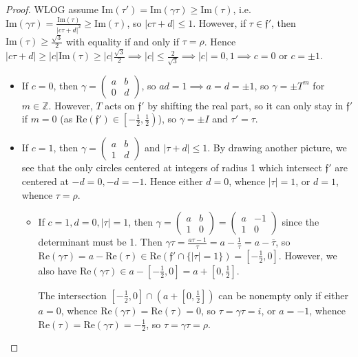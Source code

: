 \documentclass{article}
\theoremstyle{definition}
\begin{document}
\begin{proof}
    WLOG assume $\text{Im}(\tau') = \text{Im}(\gamma \tau) \ge \text{Im}(\tau)$, i.e. $\text{Im}(\gamma \tau) = \frac{\text{Im}(\tau)}{|c \tau + d|^2} \ge \text{Im}(\tau)$, so $|c \tau +d| \le 1$. However, if $\tau \in \mathfrak{f}'$, then $\text{Im}(\tau) \ge \frac{\sqrt{3}}{2}$ with equality if and only if $\tau = \rho$. Hence $|c \tau + d| \ge |c| \text{Im}(\tau) \ge |c|\frac{\sqrt{3}}{2} \implies |c|\le \frac{2}{\sqrt{3}} \implies |c| = 0, 1 \implies c = 0$ or $c = \pm 1$. 
    \begin{itemize}
        \item If $c=0$, then $\gamma =\begin{pmatrix} a&b\\0&d \end{pmatrix}$, so $ad = 1 \implies a = d = \pm 1$, so $\gamma = \pm T^m$ for $m \in \mathbb{Z}$. However, $T$ acts on $\mathfrak{f}'$ by shifting the real part, so it can only stay in $\mathfrak{f}'$ if $m = 0$ (as $\text{Re}(\mathfrak{f}') \in \left[-\frac{1}{2},\frac{1}{2}\right)$), so $\gamma = \pm I$ and $\tau' = \tau$.
        \item If $c=1$, then $\gamma = \begin{pmatrix} a & b\\1 & d \end{pmatrix}$ and $|\tau +d|\le 1$. By drawing another picture, we see that the only circles centered at integers of radius 1 which intersect $\mathfrak{f}'$ are centered at $-d = 0, -d = -1$. Hence either $d = 0$, whence $|\tau|=1$, or $d=1$, whence $\tau = \rho$.
        \begin{itemize}
            \item If $c=1, d= 0, |\tau|=1$, then $\gamma = \begin{pmatrix} a & b \\ 1& 0 \end{pmatrix} = \begin{pmatrix} a & -1 \\ 1 & 0 \end{pmatrix}$ since the determinant must be 1. Then $\gamma \tau =  \frac{a \tau - 1}{\tau} = a -\frac{1}{\tau} = a - \overline{\tau}$, so $\text{Re}(\gamma\tau) = a - \text{Re}(\tau) \in \text{Re}(\mathfrak{f}' \cap \{|\tau|=1\}) = \left[-\frac{1}{2}, 0\right]$. However, we also have $\text{Re}(\gamma \tau) \in a - \left[-\frac{1}{2},0\right] = a + \left[0,\frac{1}{2}\right]$. \vspace{1mm}
             
            The intersection $\left[-\frac{1}{2}, 0 \right] \cap \left(a + \left[0, \frac{1}{2}\right]\right)$ can be nonempty only if either $a=0$, whence $\text{Re}(\gamma \tau) = \text{Re}(\tau) = 0$, so $\tau = \gamma \tau = i$, or $a = -1$, whence $\text{Re}(\tau) = \text{Re}(\gamma \tau) = -\frac{1}{2}$, so $\tau = \gamma \tau = \rho$. 
            \vspace{1mm}
             

\end{itemize}
\end{itemize}
\end{proof}
\end{document}
